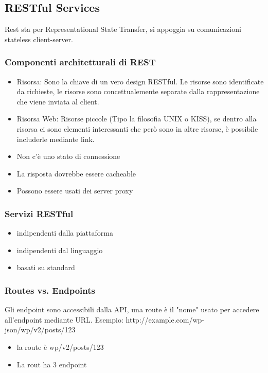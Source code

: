 \subsection{RESTful Services}
Rest sta per Representational State Transfer, si appoggia su comunicazioni stateless client-server.

\subsubsection{Componenti architetturali di REST}
\begin{itemize}
    \item Risorsa: Sono la chiave di un vero design RESTful. Le risorse sono identificate da richieste, le risorse sono concettualemente separate dalla rappresentazione che viene inviata al client.
    \item Risorsa Web: Risorse piccole (Tipo la filosofia UNIX o KISS), se dentro alla risorsa ci sono elementi interessanti che però sono in altre risorse, è possibile includerle mediante link.
    \item Non c'è uno stato di connessione
    \item La risposta dovrebbe essere cacheable
    \item Possono essere usati dei server proxy
\end{itemize}

\subsubsection{Servizi RESTful}
\begin{itemize}
    \item indipendenti dalla piattaforma
    \item indipendenti dal linguaggio
    \item basati su standard
\end{itemize}

\subsubsection{Routes vs. Endpoints}
Gli endpoint sono accessibili dalla API, una route è il "nome" usato per accedere all'endpoint mediante URL.
Esempio: http://example.com/wp-json/wp/v2/posts/123
\begin{itemize}
    \item la route è wp/v2/posts/123
    \item La rout ha 3 endpoint
\end{itemize}

